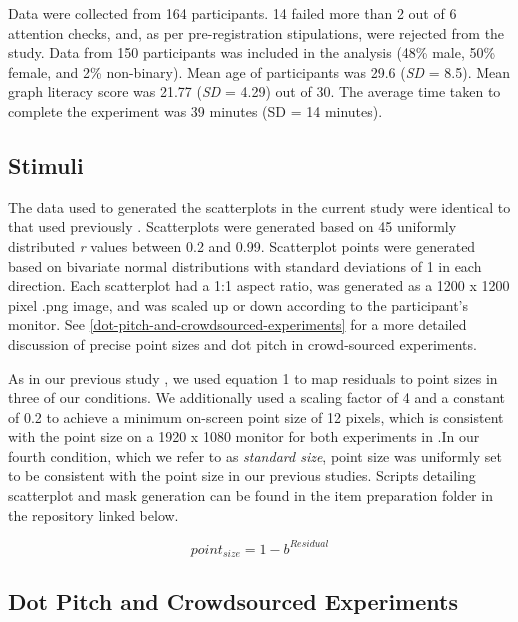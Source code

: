 \documentclass{vgtc}                          %
\begin{document}
Data were collected from 164 participants. 14 failed more than 2 out of 6 attention
checks, and, as per pre-registration stipulations, were rejected from the study. Data
from 150 participants was included in the analysis (48\% male, 50\% female, and 2\% non-binary). Mean age of participants was 29.6 (\emph{SD} = 8.5). Mean graph literacy score was 21.77
(\emph{SD} = 4.29) out of 30. The average time taken to complete
the experiment was 39 minutes (SD = 14 minutes).

\hypertarget{stimuli}{%
\subsection{Stimuli}\label{stimuli}}

The data used to generated the scatterplots in the current study were identical to that
used previously \cite{strain_2023}. Scatterplots were generated based on 45 uniformly distributed \emph{r} values between 0.2 and 0.99. Scatterplot points were generated based on bivariate normal
distributions with standard deviations of 1 in each direction. Each scatterplot
had a 1:1 aspect ratio, was generated as a 1200 x 1200 pixel .png image, and was
scaled up or down according to the participant's monitor. See \autoref{dot-pitch-and-crowdsourced-experiments} for a more detailed discussion of precise point sizes and dot pitch in crowd-sourced experiments.

As in our previous study \cite{strain_2023}, we used equation 1 to map residuals
to point sizes in three of our conditions. We additionally used a scaling factor of 4 and a constant of 0.2 to achieve a minimum on-screen point size of 12 pixels, which is consistent with the point size on
a 1920 x 1080 monitor for both experiments in \cite{strain_2023}.In our fourth condition, which we refer to as \emph{standard size}, point size was uniformly set to be consistent with the point size in our previous studies. Scripts detailing scatterplot and mask generation can be found in the item
preparation folder in the repository linked below.

\begin{equation}
  point_{size} = 1 - b^{Residual}
\end{equation}

\hypertarget{dot-pitch-and-crowdsourced-experiments}{%
\subsection{Dot Pitch and Crowdsourced Experiments}\label{dot-pitch-and-crowdsourced-experiments}}
\end{document}
